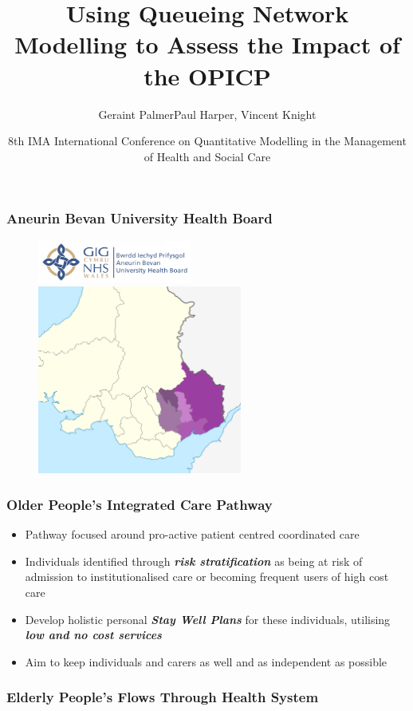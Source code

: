 \documentclass[xcolor={table}]{beamer}
\title
{Using Queueing Network Modelling to Assess the Impact of the OPICP}
\author{Geraint Palmer\newline \scriptsize{Paul Harper, Vincent Knight}}
\date{8th IMA International Conference on Quantitative Modelling in the Management of Health and Social Care}
\begin{document}
\frame{\titlepage}


\begin{frame}
\frametitle{Aneurin Bevan University Health Board}
\begin{figure}
\includegraphics[width=0.45\textwidth]{ABUHBlogo}\\
\includegraphics[width=0.6\textwidth]{Aneurin_Bevan}
\end{figure}
\end{frame}

\begin{frame}
\frametitle{Older People's Integrated Care Pathway}
\begin{itemize}
  \item Pathway focused around pro-active patient centred coordinated care
  \item Individuals identified through \textit{\textbf{risk stratification}} as being at risk of admission to institutionalised care or becoming frequent users of high cost care
  \item Develop holistic personal \textit{\textbf{Stay Well Plans}} for these individuals, utilising \textit{\textbf{low and no cost services}}
  \item Aim to keep individuals and carers as well and as independent as possible
\end{itemize}
\end{frame}

\begin{frame}
\frametitle{Elderly People's Flows Through Health System}
\begin{figure}

\end{figure}
\end{frame}
\end{document}
